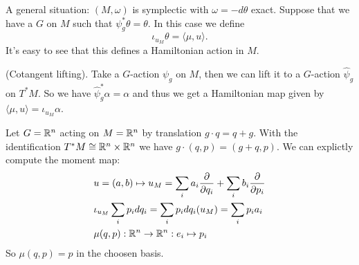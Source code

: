 \begin{example}
    A general situation: $(M,\omega)$ is symplectic with $\omega = -d\theta$ exact. Suppose that we have 
    a $G$ on $M$ such that $\psi_g^*\theta = \theta$. In this case we define 
    \begin{equation}
        \iota_{u_M}\theta =  \langle \mu,u\rangle.
    \end{equation}
    It's easy to see that this defines a Hamiltonian action in $M$.
\end{example}

\begin{example}
    (Cotangent lifting). Take a $G$-action $\psi_g$ on $M$, then we can lift 
    it to a $G$-action $\widehat{\psi}_g$ on $T^*M$. So we have $\widehat{\psi}_g^*\alpha=\alpha$ and thus we get 
    a Hamiltonian map given by $\langle\mu,u\rangle = \iota_{u_M}\alpha$. 
\end{example}

\begin{example}
    Let $G=\mathbb{R}^n$ acting on $M=\mathbb{R}^n$ by translation $g\cdot q = q+g$. With the identification 
    $T^*M\cong\mathbb{R}^n\times\mathbb{R}^n$ we have $g\cdot(q,p)=(g+q,p)$. We can explictly compute the moment map:
    \begin{equation}
        \begin{aligned}
            &u = (a,b) \mapsto u_M = \sum_ia_i\frac{\partial}{\partial q_i}+\sum_ib_i\frac{\partial}{\partial p_i}\\
            &\iota_{u_M}\sum_ip_idq_i=\sum_ip_idq_i(u_M)=\sum_ip_ia_i\\
            &\mu(q,p):\mathbb{R}^n\to\mathbb{R}^n:e_i\mapsto p_i 
        \end{aligned}
    \end{equation}
    So $\mu(q,p)=p$ in the choosen basis.
\end{example}

